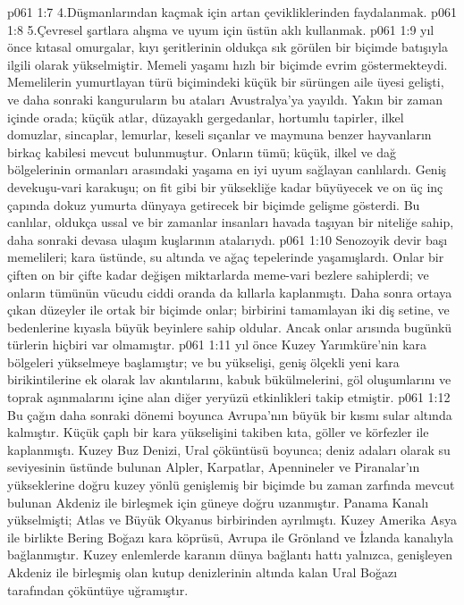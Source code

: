 \vs p061 1:7 4.\bibnobreakspace Düşmanlarından kaçmak için artan çevikliklerinden faydalanmak.
\vs p061 1:8 5.\bibnobreakspace Çevresel şartlara alışma ve uyum için üstün aklı kullanmak.
\vs p061 1:9  yıl önce kıtasal omurgalar, kıyı şeritlerinin oldukça sık görülen bir biçimde batışıyla ilgili olarak yükselmiştir. Memeli yaşamı hızlı bir biçimde evrim göstermekteydi. Memelilerin yumurtlayan türü biçimindeki küçük bir sürüngen aile üyesi gelişti, ve daha sonraki kanguruların bu ataları Avustralya’ya yayıldı. Yakın bir zaman içinde orada; küçük atlar, düzayaklı gergedanlar, hortumlu tapirler, ilkel domuzlar, sincaplar, lemurlar, keseli sıçanlar ve maymuna benzer hayvanların birkaç kabilesi mevcut bulunmuştur. Onların tümü; küçük, ilkel ve dağ bölgelerinin ormanları arasındaki yaşama en iyi uyum sağlayan canlılardı. Geniş devekuşu\hyp{}vari karakuşu; on fit gibi bir yüksekliğe kadar büyüyecek ve on üç inç çapında dokuz yumurta dünyaya getirecek bir biçimde gelişme gösterdi. Bu canlılar, oldukça ussal ve bir zamanlar insanları havada taşıyan bir niteliğe sahip, daha sonraki devasa ulaşım kuşlarının atalarıydı.
\vs p061 1:10 Senozoyik devir başı memelileri; kara üstünde, su altında ve ağaç tepelerinde yaşamışlardı. Onlar bir çiften on bir çifte kadar değişen miktarlarda meme\hyp{}vari bezlere sahiplerdi; ve onların tümünün vücudu ciddi oranda da kıllarla kaplanmıştı. Daha sonra ortaya çıkan düzeyler ile ortak bir biçimde onlar; birbirini tamamlayan iki diş setine, ve bedenlerine kıyasla büyük beyinlere sahip oldular. Ancak onlar arısında bugünkü türlerin hiçbiri var olmamıştır.
\vs p061 1:11  yıl önce Kuzey Yarımküre’nin kara bölgeleri yükselmeye başlamıştır; ve bu yükselişi, geniş ölçekli yeni kara birikintilerine ek olarak lav akıntılarını, kabuk bükülmelerini, göl oluşumlarını ve toprak aşınmalarını içine alan diğer yeryüzü etkinlikleri takip etmiştir.
\vs p061 1:12 Bu çağın daha sonraki dönemi boyunca Avrupa’nın büyük bir kısmı sular altında kalmıştır. Küçük çaplı bir kara yükselişini takiben kıta, göller ve körfezler ile kaplanmıştı. Kuzey Buz Denizi, Ural çöküntüsü boyunca; deniz adaları olarak su seviyesinin üstünde bulunan Alpler, Karpatlar, Apennineler ve Piranalar’ın yükseklerine doğru kuzey yönlü genişlemiş bir biçimde bu zaman zarfında mevcut bulunan Akdeniz ile birleşmek için güneye doğru uzanmıştır. Panama Kanalı yükselmişti; Atlas ve Büyük Okyanus birbirinden ayrılmıştı. Kuzey Amerika Asya ile birlikte Bering Boğazı kara köprüsü, Avrupa ile Grönland ve İzlanda kanalıyla bağlanmıştır. Kuzey enlemlerde karanın dünya bağlantı hattı yalnızca, genişleyen Akdeniz ile birleşmiş olan kutup denizlerinin altında kalan Ural Boğazı tarafından çöküntüye uğramıştır.
